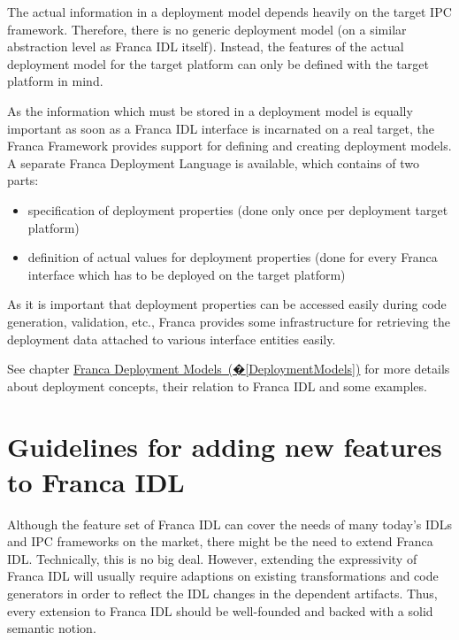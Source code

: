 \documentclass[a4paper,10pt]{scrreprt}
\newlength{\XdocItemIndent}
\begin{document}
The actual information in a deployment model depends heavily on the target IPC framework.
Therefore, there is no generic deployment model (on a similar abstraction level as Franca IDL itself).
Instead, the features of the actual deployment model for the target platform can only
be defined with the target platform in mind.

As the information which must be stored in a deployment model is equally important
as soon as a Franca IDL interface is incarnated on a real target, the Franca Framework
provides support for defining and creating deployment models.
A separate Franca Deployment Language is available, which contains of two parts:
\setlength{\XdocItemIndent}{\textwidth}
\begin{itemize}
\addtolength{\XdocItemIndent}{-2.5em}
\item \begin{minipage}[t]{\XdocItemIndent}
specification of deployment properties (done only once per deployment target platform)

\end{minipage}
\item \begin{minipage}[t]{\XdocItemIndent}
definition of actual values for deployment properties (done for every Franca interface
		which has to be deployed on the target platform)

\end{minipage}
\end{itemize}
\addtolength{\XdocItemIndent}{2.5em}

As it is important that deployment properties can be accessed easily during code generation,
validation, etc., Franca provides some infrastructure for retrieving the deployment data
attached to various interface entities easily.

See chapter \hyperref[DeploymentModels]{Franca Deployment Models~(�\ref*{DeploymentModels})} for more details 
about deployment concepts, their relation to Franca IDL and some examples.

\section{Guidelines for adding new features to Franca IDL}
\label{FrancaConcepts_AddingFeatures}
Although the feature set of Franca IDL can cover the needs of many today's IDLs
and IPC frameworks on the market, there might be the need to extend Franca IDL.
Technically, this is no big deal. However, extending the expressivity of Franca IDL
will usually require adaptions on existing transformations and code generators
in order to reflect the IDL changes in the dependent artifacts. Thus, every extension
to Franca IDL should be well-founded and backed with a solid semantic notion. 
\end{document}
